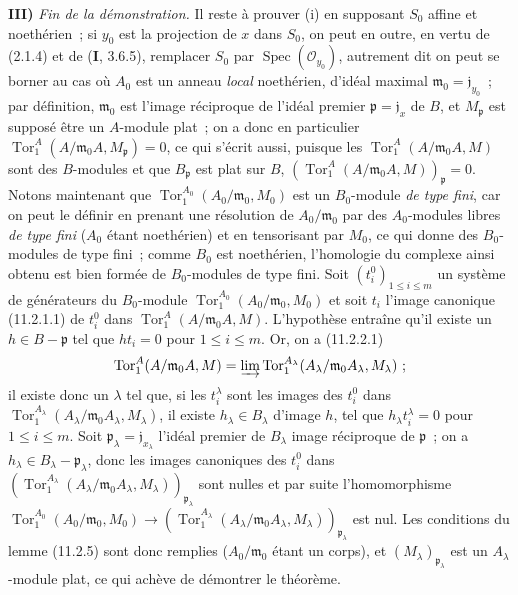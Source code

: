 \medskip
\noindent\textbf{III)} \emph{Fin de la démonstration.} Il reste à prouver
(i) en supposant $S_0$ affine et noethérien~; si $y_0$ est la projection de
$x$ dans $S_0$, on peut en outre, en vertu de (2.1.4) et de
($\mathbf I$, 3.6.5), remplacer $S_0$ par
$\operatorname{Spec}(\mathcal O_{y_0})$, autrement dit on peut se borner au
cas où $A_0$ est un anneau \emph{local} noethérien, d'idéal maximal
$\mathfrak m_0=\mathfrak j_{y_0}$~; par définition, $\mathfrak m_0$ est
l'image réciproque de l'idéal premier $\mathfrak p=\mathfrak j_x$ de $B$,
et $M_{\mathfrak p}$ est supposé être un $A$-module plat~; on a donc en
particulier $\operatorname{Tor}_1^A(A/\mathfrak m_0A,M_{\mathfrak p})=0$,
ce qui s'écrit aussi, puisque les $\operatorname{Tor}_1^A(A/\mathfrak m_0A,M)$
sont des $B$-modules et que $B_{\mathfrak p}$ est plat sur $B$,
$(\operatorname{Tor}_1^A(A/\mathfrak m_0A,M))_{\mathfrak p}=0$.
Notons maintenant que $\operatorname{Tor}_1^{A_0}(A_0/\mathfrak m_0,M_0)$
est un $B_0$-module \emph{de type fini}, car on peut le définir en prenant
une résolution de $A_0/\mathfrak m_0$ par des $A_0$-modules libres
\emph{de type fini} ($A_0$ étant noethérien) et en tensorisant par $M_0$, ce
qui donne des $B_0$-modules de type fini~; comme $B_0$ est noethérien,
l'homologie du complexe ainsi obtenu est bien formée de $B_0$-modules de
type fini. Soit $(t_i^0)_{1\leq i\leq m}$ un système de générateurs du
$B_0$-module $\operatorname{Tor}_1^{A_0}(A_0/\mathfrak m_0,M_0)$ et soit
$t_i$ l'image canonique (11.2.1.1) de $t_i^0$ dans
$\operatorname{Tor}_1^A(A/\mathfrak m_0A,M)$. L'hypothèse entraîne qu'il
existe un $h\in B-\mathfrak p$ tel que $ht_i=0$ pour $1\leq i\leq m$. Or,
on a (11.2.2.1)
\[
\operatorname{Tor}_1^A(A/\mathfrak m_0A,M)=
\varinjlim\operatorname{Tor}_1^{A_\lambda}
(A_\lambda/\mathfrak m_0A_\lambda,M_\lambda)~;
\]
il existe donc un $\lambda$ tel que, si les $t_i^\lambda$ sont les images
des $t_i^0$ dans
$\operatorname{Tor}_1^{A_\lambda}(A_\lambda/\mathfrak m_0A_\lambda,
M_\lambda)$, il existe $h_\lambda\in B_\lambda$ d'image $h$, tel que
$h_\lambda t_i^\lambda=0$ pour $1\leq i\leq m$. Soit
$\mathfrak p_\lambda=\mathfrak j_{x_\lambda}$ l'idéal premier de
$B_\lambda$ image réciproque de $\mathfrak p$~; on a
$h_\lambda\in B_\lambda-\mathfrak p_\lambda$, donc les images canoniques
des $t_i^0$ dans
$(\operatorname{Tor}_1^{A_\lambda}(A_\lambda/\mathfrak m_0A_\lambda,
M_\lambda))_{\mathfrak p_\lambda}$ sont nulles et par suite
l'homomorphisme
$\operatorname{Tor}_1^{A_0}(A_0/\mathfrak m_0,M_0)\to
(\operatorname{Tor}_1^{A_\lambda}(A_\lambda/\mathfrak m_0A_\lambda,
M_\lambda))_{\mathfrak p_\lambda}$ est nul. Les conditions du lemme
(11.2.5) sont donc remplies ($A_0/\mathfrak m_0$ étant un corps), et
$(M_\lambda)_{\mathfrak p_\lambda}$ est un $A_\lambda$-module plat, ce qui
achève de démontrer le théorème.

